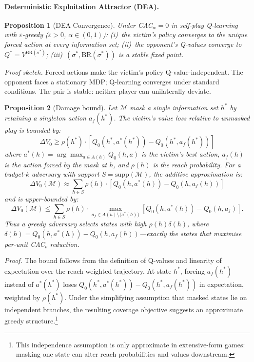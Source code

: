 \documentclass{article}
\newtheorem{proposition}{Proposition}
\begin{document}
\paragraph{Deterministic Exploitation Attractor (DEA).}

\begin{proposition}[DEA Convergence]
Under CAC$_w = 0$ in self-play Q-learning with $\varepsilon$-greedy ($\varepsilon > 0$, $\alpha \in (0,1)$):
(i)~the victim's policy converges to the unique forced action at every information set;
(ii)~the opponent's Q-values converge to $Q^* = V^{\text{BR}(\sigma^*)}$;
(iii)~$(\sigma^*, \text{BR}(\sigma^*))$ is a stable fixed point.
\end{proposition}

\emph{Proof sketch.} Forced actions make the victim's policy Q-value-independent. The opponent faces a stationary MDP; Q-learning converges under standard conditions. The pair is stable: neither player can unilaterally deviate.

\begin{proposition}[Damage bound]
Let $\mathcal{M}$ mask a single information set $h^*$ by retaining a singleton action $a_f(h^*)$. The victim's value loss relative to unmasked play is bounded by:
\[
\Delta V_0 \geq \rho(h^*) \cdot [Q_0(h^*, a^*(h^*)) - Q_0(h^*, a_f(h^*))]
\]
where $a^*(h)=\arg\max_{a\in A(h)} Q_0(h,a)$ is the victim's best action, $a_f(h)$ is the action forced by the mask at $h$, and $\rho(h)$ is the reach probability. For a budget-$k$ adversary with support $S=\text{supp}(\mathcal{M})$, the additive approximation is:
\[
\Delta V_0(\mathcal{M}) \approx
\sum_{h \in S} \rho(h) \cdot [Q_0(h,a^*(h)) - Q_0(h,a_f(h))]
\]
and is upper-bounded by:
\[
\Delta V_0(\mathcal{M}) \leq
\sum_{h \in S} \rho(h) \cdot \max_{a_f \in A(h)\setminus\{a^*(h)\}}
[Q_0(h,a^*(h)) - Q_0(h,a_f)].
\]
Thus a greedy adversary selects states with high $\rho(h)\delta(h)$, where $\delta(h)=Q_0(h,a^*(h))-Q_0(h,a_f(h))$---exactly the states that maximise per-unit CAC$_v$ reduction.
\end{proposition}

\emph{Proof.} The bound follows from the definition of Q-values and linearity of expectation over the reach-weighted trajectory. At state $h^*$, forcing $a_f(h^*)$ instead of $a^*(h^*)$ loses $Q_0(h^*,a^*(h^*)) - Q_0(h^*,a_f(h^*))$ in expectation, weighted by $\rho(h^*)$. Under the simplifying assumption that masked states lie on independent branches, the resulting coverage objective suggests an approximate greedy structure.\footnote{This independence assumption is only approximate in extensive-form games: masking one state can alter reach probabilities and values downstream.}
\end{document}
